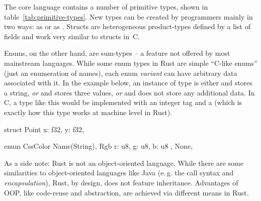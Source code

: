 The core language contains a number of primitive types, shown in table~\ref{tab:primitive-types}.
New types can be created by programmers mainly in two ways: as  or as .
Structs are heterogeneous product-types defined by a list of fields and work very similar to structs in~C.

Enums, on the other hand, are sum-types -- a feature not offered by most mainstream languages.
While some enum types in Rust are simple \enquote{C-like enums} (just an enumeration of names), each enum \emph{variant} can have arbitrary data associated with it.
In the example below, an instance of type  is either  and stores a string, \emph{or}  and stores three  values, \emph{or}  and does not store any additional data.
In C, a type like this would be implemented with an integer tag and a  (which is exactly how this type works at machine level in Rust).

\vspace{-3mm}
\begin{center}
\begin{minipage}[t]{.45\textwidth}
\begin{rustcode}
struct Point {
    x: f32,
    y: f32,
}
\end{rustcode}
\end{minipage}
\begin{minipage}[t]{.45\textwidth}
\begin{rustcode}
enum CssColor {
    Name(String),
    Rgb { r: u8, g: u8, b: u8 },
    None,
}
\end{rustcode}
\end{minipage}
\end{center}

As a side note: Rust is not an object-oriented language.
While there are some similarities to object-oriented languages like Java (e.\,g. the  call syntax and \emph{encapsulation}), Rust, by design, does not feature inheritance.
Advantages of OOP, like code-reuse and abstraction, are achieved via different means in Rust.


